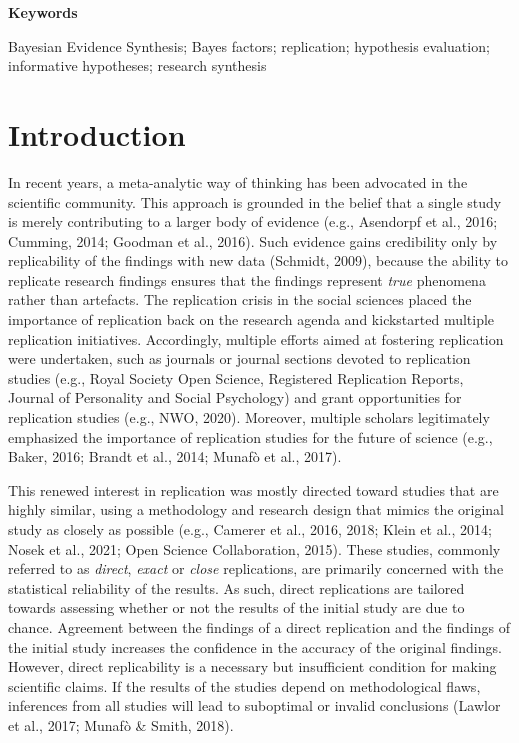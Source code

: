 \documentclass[
]{interact}
\begin{document}
\textbf{Keywords}

Bayesian Evidence Synthesis; Bayes factors; replication; hypothesis
evaluation; informative hypotheses; research synthesis

\hypertarget{introduction}{%
\section{Introduction}\label{introduction}}

In recent years, a meta-analytic way of thinking has been advocated in
the scientific community. This approach is grounded in the belief that a
single study is merely contributing to a larger body of evidence (e.g.,
Asendorpf et al., 2016; Cumming, 2014; Goodman et al., 2016). Such
evidence gains credibility only by replicability of the findings with
new data (Schmidt, 2009), because the ability to replicate research
findings ensures that the findings represent \emph{true} phenomena
rather than artefacts. The replication crisis in the social sciences
placed the importance of replication back on the research agenda and
kickstarted multiple replication initiatives. Accordingly, multiple
efforts aimed at fostering replication were undertaken, such as journals
or journal sections devoted to replication studies (e.g., Royal Society
Open Science, Registered Replication Reports, Journal of Personality and
Social Psychology) and grant opportunities for replication studies
(e.g., NWO, 2020). Moreover, multiple scholars legitimately emphasized
the importance of replication studies for the future of science (e.g.,
Baker, 2016; Brandt et al., 2014; Munafò et al., 2017).

This renewed interest in replication was mostly directed toward studies
that are highly similar, using a methodology and research design that
mimics the original study as closely as possible (e.g., Camerer et al.,
2016, 2018; Klein et al., 2014; Nosek et al., 2021; Open Science
Collaboration, 2015). These studies, commonly referred to as
\emph{direct}, \emph{exact} or \emph{close} replications, are primarily
concerned with the statistical reliability of the results. As such,
direct replications are tailored towards assessing whether or not the
results of the initial study are due to chance. Agreement between the
findings of a direct replication and the findings of the initial study
increases the confidence in the accuracy of the original findings.
However, direct replicability is a necessary but insufficient condition
for making scientific claims. If the results of the studies depend on
methodological flaws, inferences from all studies will lead to
suboptimal or invalid conclusions (Lawlor et al., 2017; Munafò \& Smith,
2018).
\end{document}
